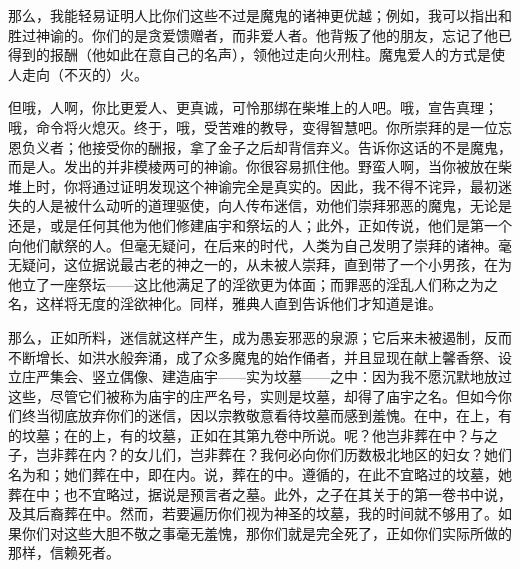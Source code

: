 那么，我能轻易证明人比你们这些不过是魔鬼的诸神更优越；例如，我可以指出和胜过神谕的。你们的是贪爱馈赠者，而非爱人者。他背叛了他的朋友，忘记了他已得到的报酬（他如此在意自己的名声），领他过走向火刑柱。魔鬼爱人的方式是使人走向（不灭的）火。\par

但哦，人啊，你比更爱人、更真诚，可怜那绑在柴堆上的人吧。哦，宣告真理；哦，命令将火熄灭。终于，哦，受苦难的教导，变得智慧吧。你所崇拜的是一位忘恩负义者；他接受你的酬报，拿了金子之后却背信弃义。告诉你这话的不是魔鬼，而是人。发出的并非模棱两可的神谕。你很容易抓住他。野蛮人啊，当你被放在柴堆上时，你将通过证明发现这个神谕完全是真实的。因此，我不得不诧异，最初迷失的人是被什么动听的道理驱使，向人传布迷信，劝他们崇拜邪恶的魔鬼，无论是还是，或是任何其他为他们修建庙宇和祭坛的人；此外，正如传说，他们是第一个向他们献祭的人。但毫无疑问，在后来的时代，人类为自己发明了崇拜的诸神。毫无疑问，这位据说最古老的神之一的，从未被人崇拜，直到带了一个小男孩，在为他立了一座祭坛——这比他满足了的淫欲更为体面；而罪恶的淫乱人们称之为之名，这样将无度的淫欲神化。同样，雅典人直到告诉他们才知道是谁。\par

那么，正如所料，迷信就这样产生，成为愚妄邪恶的泉源；它后来未被遏制，反而不断增长、如洪水般奔涌，成了众多魔鬼的始作俑者，并且显现在献上馨香祭、设立庄严集会、竖立偶像、建造庙宇——实为坟墓——之中：因为我不愿沉默地放过这些，尽管它们被称为庙宇的庄严名号，实则是坟墓，却得了庙宇之名。但如今你们终当彻底放弃你们的迷信，因以宗教敬意看待坟墓而感到羞愧。在中，在上，有的坟墓；在的上，有的坟墓，正如在其第九卷中所说。呢？他岂非葬在中？与之子，岂非葬在内？的女儿们，岂非葬在？我何必向你们历数极北地区的妇女？她们名为和；她们葬在中，即在内。说，葬在的中。遵循的，在此不宜略过的坟墓，她葬在中；也不宜略过，据说是预言者之墓。此外，之子在其关于的第一卷书中说，及其后裔葬在中。然而，若要遍历你们视为神圣的坟墓，我的时间就不够用了。如果你们对这些大胆不敬之事毫无羞愧，那你们就是完全死了，正如你们实际所做的那样，信赖死者。\par

